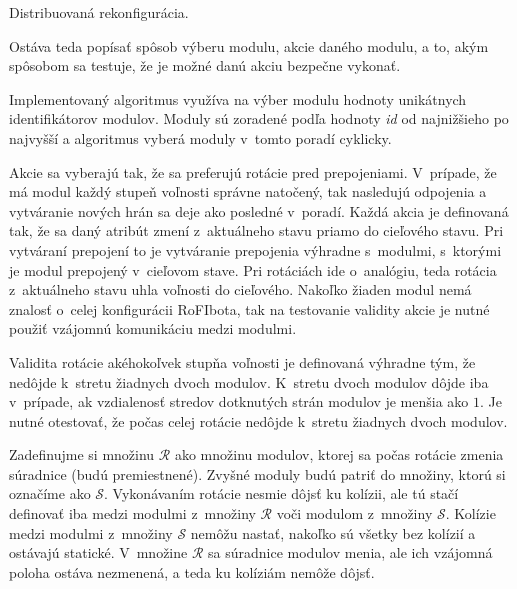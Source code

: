 \documentclass[
  printed, %
  oneside, %
  notable,   %
  nolof,     %
  nolot,     %
]{fithesis3}
\begin{document}
\begin{algorithm}
    \caption{Distribuovaná rekonfigurácia. }
    \label{algorithm:algo2}
    
    \DontPrintSemicolon
    
\end{algorithm}

Ostáva teda popísať spôsob výberu modulu, akcie daného modulu, a to, akým spôsobom sa testuje, že je možné danú akciu bezpečne vykonať. 

Implementovaný algoritmus využíva na výber modulu hodnoty unikátnych identifikátorov modulov. Moduly sú zoradené podľa hodnoty \textit{id} od najnižšieho po najvyšší a algoritmus vyberá moduly v~tomto poradí cyklicky. 

Akcie sa vyberajú tak, že sa preferujú rotácie pred prepojeniami. V~prípade, že má modul každý stupeň voľnosti správne natočený, tak nasledujú odpojenia a vytváranie nových hrán sa deje ako posledné v~poradí. Každá akcia je definovaná tak, že sa daný atribút zmení z~aktuálneho stavu priamo do cieľového stavu. Pri vytváraní prepojení to je vytváranie prepojenia výhradne s~modulmi, s~ktorými je modul prepojený v~cieľovom stave. Pri rotáciách ide o~analógiu, teda rotácia z~aktuálneho stavu uhla voľnosti do cieľového. Nakoľko žiaden modul nemá znalosť o~celej konfigurácii RoFIbota, tak na testovanie validity akcie je nutné použiť vzájomnú komunikáciu medzi modulmi. 

Validita rotácie akéhokoľvek stupňa voľnosti je definovaná výhradne tým, že nedôjde k~stretu žiadnych dvoch modulov. K~stretu dvoch modulov dôjde iba v~prípade, ak vzdialenosť stredov dotknutých strán modulov je menšia ako $1$. Je nutné otestovať, že počas celej rotácie nedôjde k~stretu žiadnych dvoch modulov. 

Zadefinujme si množinu $\mathcal{R}$ ako množinu modulov, ktorej sa počas rotácie zmenia súradnice (budú premiestnené). Zvyšné moduly budú patriť do množiny, ktorú si označíme ako $\mathcal{S}$. Vykonávaním rotácie nesmie dôjsť ku kolízii, ale tú stačí definovať iba medzi modulmi z~množiny $\mathcal{R}$ voči modulom z~množiny $\mathcal{S}$. Kolízie medzi modulmi z~množiny $\mathcal{S}$ nemôžu nastať, nakoľko sú všetky bez kolízií a ostávajú statické. V~množine $\mathcal{R}$ sa súradnice modulov menia, ale ich vzájomná poloha ostáva nezmenená, a teda ku kolíziám nemôže dôjsť. 
\end{document}
